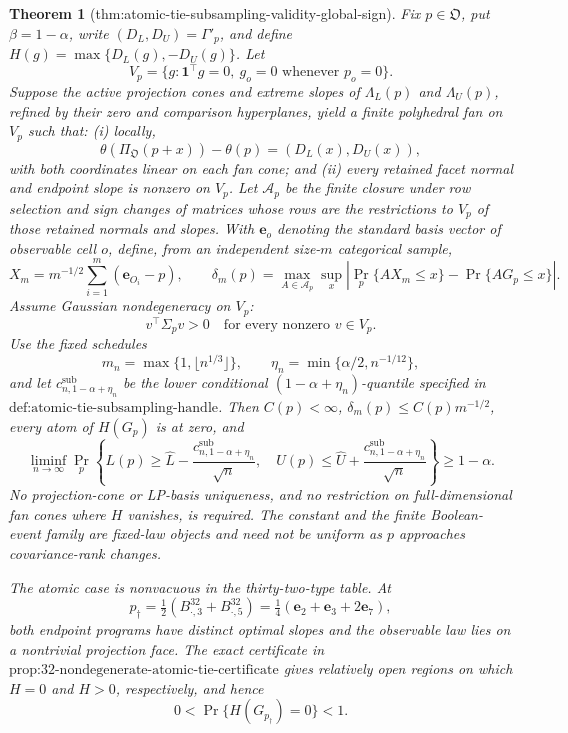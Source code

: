 \documentclass{article}
\newtheorem{theorem}{Theorem}
\begin{document}
\begin{theorem}[thm:atomic-tie-subsampling-validity-global-sign]\label{thm:atomic-tie-subsampling-validity-global-sign}
Fix \(p\in\mathfrak O\), put \(\beta=1-\alpha\), write \((D_L,D_U)=\Gamma'_p\), and define \(H(g)=\max\{D_L(g),-D_U(g)\}\).  Let
\[
V_p=\{g:\mathbf 1^{\top}g=0,\ g_o=0\text{ whenever }p_o=0\}.
\]
Suppose the active projection cones and extreme slopes of \(\Lambda_L(p)\) and \(\Lambda_U(p)\), refined by their zero and comparison hyperplanes, yield a finite polyhedral fan on \(V_p\) such that: (i) locally,
\[
\theta(\Pi_{\mathfrak O}(p+x))-\theta(p)=(D_L(x),D_U(x)),
\]
with both coordinates linear on each fan cone; and (ii) every retained facet normal and endpoint slope is nonzero on \(V_p\).  Let \(\mathcal A_p\) be the finite closure under row selection and sign changes of matrices whose rows are the restrictions to \(V_p\) of those retained normals and slopes.  With \(\mathbf e_o\) denoting the standard basis vector of observable cell \(o\), define, from an independent size-\(m\) categorical sample,
\[
X_m=m^{-1/2}\sum_{i=1}^m(\mathbf e_{O_i}-p),
\qquad
\delta_m(p)=\max_{A\in\mathcal A_p}\sup_x
\left|\Pr_p\{AX_m\leq x\}-\Pr\{AG_p\leq x\}\right|.
\]
Assume Gaussian nondegeneracy on \(V_p\):
\[
v^{\top}\Sigma_pv>0\quad\text{for every nonzero }v\in V_p.
\]
Use the fixed schedules
\[
m_n=\max\{1,\lfloor n^{1/3}\rfloor\},
\qquad
\eta_n=\min\{\alpha/2,n^{-1/12}\},
\]
and let \(c^{\mathrm{sub}}_{n,1-\alpha+\eta_n}\) be the lower conditional \((1-\alpha+\eta_n)\)-quantile specified in \(\text{def:atomic-tie-subsampling-handle}\).  Then \(C(p)<\infty\), \(\delta_m(p)\leq C(p)m^{-1/2}\), every atom of \(H(G_p)\) is at zero, and
\[
\liminf_{n\to\infty}\Pr_p\left\{
L(p)\geq\widehat L-\frac{c^{\mathrm{sub}}_{n,1-\alpha+\eta_n}}{\sqrt n},
\quad
U(p)\leq\widehat U+\frac{c^{\mathrm{sub}}_{n,1-\alpha+\eta_n}}{\sqrt n}
\right\}\geq1-\alpha.
\]
No projection-cone or LP-basis uniqueness, and no restriction on full-dimensional fan cones where \(H\) vanishes, is required.  The constant and the finite Boolean-event family are fixed-law objects and need not be uniform as \(p\) approaches covariance-rank changes.

The atomic case is nonvacuous in the thirty-two-type table.  At
\[
p_\dagger=\tfrac12(B^{32}_{\cdot,3}+B^{32}_{\cdot,5})
=\tfrac14(\mathbf e_2+\mathbf e_3+2\mathbf e_7),
\]
both endpoint programs have distinct optimal slopes and the observable law lies on a nontrivial projection face.  The exact certificate in \(\text{prop:32-nondegenerate-atomic-tie-certificate}\) gives relatively open regions on which \(H=0\) and \(H>0\), respectively, and hence
\[
0<\Pr\{H(G_{p_\dagger})=0\}<1.
\]
\end{theorem}
\end{document}
